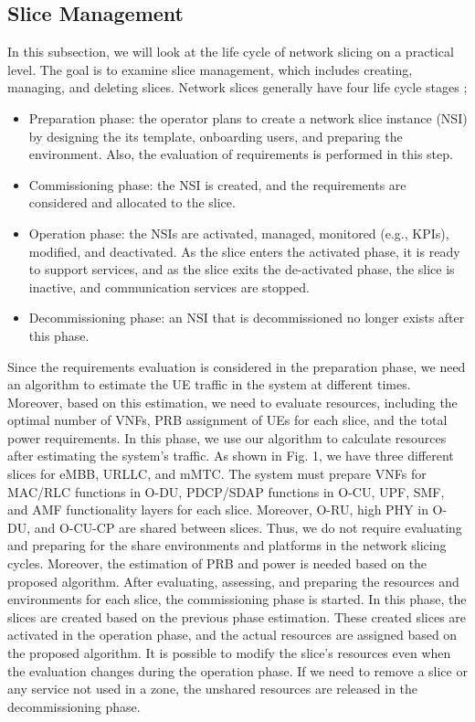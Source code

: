 \documentclass[lettersize,journal]{IEEEtran}
\begin{document}
\subsection{Slice Management}
In this subsection, we will look at the life cycle of network slicing on a practical level. 
The goal is to examine slice management, which includes creating, managing, and deleting slices. Network slices generally have four life cycle stages \cite{ETSI2};
\begin{itemize}
\item Preparation phase: the operator plans to create a network slice instance (NSI) by designing the its template, onboarding users, and preparing the environment. Also, the evaluation of requirements is performed in this step.
\item Commissioning phase: the NSI is created, and the requirements are considered and allocated to the slice.
\item Operation phase: the NSIs are activated, managed, monitored (e.g., KPIs), modified, and deactivated. As the slice enters the activated phase, it is ready to support services, and as the slice exits the de-activated phase, the slice is inactive, and communication services are stopped.
\item Decommissioning phase: an NSI that is decommissioned no longer exists after this phase.
\end{itemize}
Since the requirements evaluation is considered in the preparation phase, we need an algorithm to estimate the UE traffic in the system at different times. Moreover, based on this estimation, we need to evaluate resources, including the optimal number of VNFs, PRB assignment of UEs for each slice, and the total power requirements. In this phase, we use our algorithm to calculate resources after estimating the system's traffic.
As shown in Fig. 1, we have three different slices for eMBB, URLLC, and mMTC. The system must prepare VNFs for MAC/RLC functions in O-DU, PDCP/SDAP functions in O-CU, UPF, SMF, and AMF functionality layers for each slice. Moreover, O-RU, high PHY in O-DU, and O-CU-CP are shared between slices. Thus, we do not require evaluating and preparing for the share environments and platforms in the network slicing cycles. Moreover, the estimation of PRB and power is needed based on the proposed algorithm. 
After evaluating, assessing, and preparing the resources and environments for each slice, the commissioning phase is started. In this phase, the slices are created based on the previous phase estimation. These created slices are activated in the operation phase, and the actual resources are assigned based on the proposed algorithm.
It is possible to modify the slice's resources even when the evaluation changes during the operation phase. 
If we need to remove a slice or any service not used in a zone, the unshared resources are released in the decommissioning phase.
\end{document}

